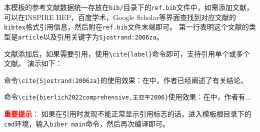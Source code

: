 本模板的参考文献数据统一存放在\verb|bib/|目录下的\verb|ref.bib|文件中，如需添加文献，可以在INSPIRE HEP，百度学术，Google Scholar等界面查找到对应文献的\verb|bibtex|格式引用信息，然后附在\verb|ref.bib|文件末端即可。
第一行表明这个文献的类型是\verb|article|以及引用关键字为\verb|Sjostrand:2006za|。

文献添加后，如果需要引用，使用\verb|\cite{label}|命令即可，支持引用单个或多个文献。
演示如下：

命令\verb|\cite{Sjostrand:2006za}|的使用效果：在\cite{Sjostrand:2006za}中，作者已经阐述了有关结论。

命令\verb|\cite{bierlich2022comprehensive,王亚平2006}|使用效果：在\cite{bierlich2022comprehensive,王亚平2006}中，作者有...

{\bf \textcolor{red}{重要提示}}：
如果在引用时发现不能正常显示引用标志的话，进入模板根目录下的\verb|cmd|环境，输入\verb|biber main|命令，然后再次编译即可。
